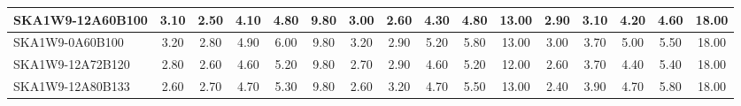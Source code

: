\begin{table}[H]
{{\begin{tabular}{|lccccc||ccccc||ccccc|}
SKA1W9-12A60B100 & 3.10 \cellcolor{blue!48.00} & 2.50 \cellcolor{red!18.00} & 4.10 \cellcolor{green!30.00} & 4.80 \cellcolor{orange!18.00} & 9.80 \cellcolor{purple!60.00} & 3.00 \cellcolor{blue!46.00} & 2.60 \cellcolor{red!20.63} & 4.30 \cellcolor{green!25.64} & 4.80 \cellcolor{orange!21.82} & 13.00 \cellcolor{purple!60.00} & 2.90 \cellcolor{blue!44.25} & 3.10 \cellcolor{red!29.20} & 4.20 \cellcolor{green!26.40} & 4.60 \cellcolor{orange!24.00} & 18.00 \cellcolor{purple!60.00}\\ \hline 
SKA1W9-0A60B100 & 3.20 \cellcolor{blue!54.00} & 2.80 \cellcolor{red!27.00} & 4.90 \cellcolor{green!54.00} & 6.00 \cellcolor{orange!60.00} & 9.80 \cellcolor{purple!60.00} & 3.20 \cellcolor{blue!60.00} & 2.90 \cellcolor{red!28.50} & 5.20 \cellcolor{green!60.00} & 5.80 \cellcolor{orange!60.00} & 13.00 \cellcolor{purple!60.00} & 3.00 \cellcolor{blue!49.50} & 3.70 \cellcolor{red!46.00} & 5.00 \cellcolor{green!60.00} & 5.50 \cellcolor{orange!51.00} & 18.00 \cellcolor{purple!60.00}\\ \hline 
SKA1W9-12A72B120 & 2.80 \cellcolor{blue!30.00} & 2.60 \cellcolor{red!21.00} & 4.60 \cellcolor{green!45.00} & 5.20 \cellcolor{orange!32.00} & 9.80 \cellcolor{purple!60.00} & 2.70 \cellcolor{blue!25.00} & 2.90 \cellcolor{red!28.50} & 4.60 \cellcolor{green!37.09} & 5.20 \cellcolor{orange!37.09} & 12.00 \cellcolor{purple!18.00} & 2.60 \cellcolor{blue!28.50} & 3.70 \cellcolor{red!46.00} & 4.40 \cellcolor{green!34.80} & 5.40 \cellcolor{orange!48.00} & 18.00 \cellcolor{purple!60.00}\\ \hline 
SKA1W9-12A80B133 & 2.60 \cellcolor{blue!18.00} & 2.70 \cellcolor{red!24.00} & 4.70 \cellcolor{green!48.00} & 5.30 \cellcolor{orange!35.50} & 9.80 \cellcolor{purple!60.00} & 2.60 \cellcolor{blue!18.00} & 3.20 \cellcolor{red!36.38} & 4.70 \cellcolor{green!40.91} & 5.50 \cellcolor{orange!48.55} & 13.00 \cellcolor{purple!60.00} & 2.40 \cellcolor{blue!18.00} & 3.90 \cellcolor{red!51.60} & 4.70 \cellcolor{green!47.40} & 5.80 \cellcolor{orange!60.00} & 18.00 \cellcolor{purple!60.00}\\ \hline 
\end{tabular}}
\vspace{-0.300000cm}
\hspace{1cm} 
}
\end{table}
